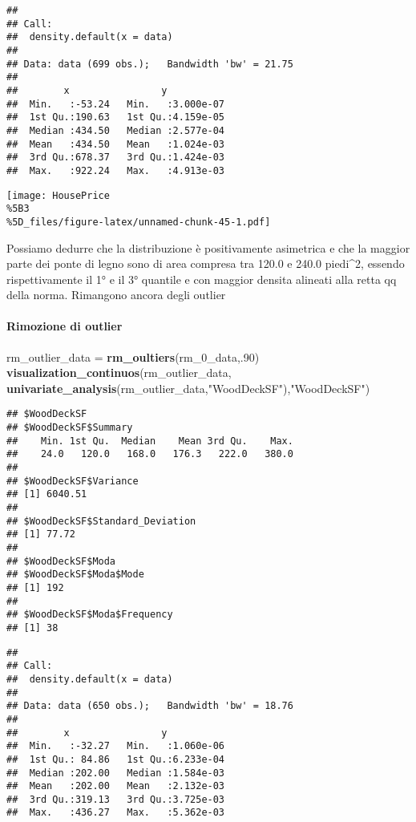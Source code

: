 \documentclass[
]{article}
\newenvironment{Shaded}{\begin{snugshade}}{\end{snugshade}}
\newcommand{\DecValTok}[1]{\textcolor[rgb]{0.00,0.00,0.81}{#1}}
\newcommand{\FunctionTok}[1]{\textcolor[rgb]{0.13,0.29,0.53}{\textbf{#1}}}
\newcommand{\NormalTok}[1]{#1}
\newcommand{\OtherTok}[1]{\textcolor[rgb]{0.56,0.35,0.01}{#1}}
\newcommand{\StringTok}[1]{\textcolor[rgb]{0.31,0.60,0.02}{#1}}
\begin{document}
\begin{verbatim}
## 
## Call:
##  density.default(x = data)
## 
## Data: data (699 obs.);   Bandwidth 'bw' = 21.75
## 
##        x                y            
##  Min.   :-53.24   Min.   :3.000e-07  
##  1st Qu.:190.63   1st Qu.:4.159e-05  
##  Median :434.50   Median :2.577e-04  
##  Mean   :434.50   Mean   :1.024e-03  
##  3rd Qu.:678.37   3rd Qu.:1.424e-03  
##  Max.   :922.24   Max.   :4.913e-03
\end{verbatim}

\texttt{[image: HousePrice\\\%5B3\\\%5D\_files/figure-latex/unnamed-chunk-45-1.pdf]}

Possiamo dedurre che la distribuzione è positivamente asimetrica e che
la maggior parte dei ponte di legno sono di area compresa tra 120.0 e
240.0 piedi\^{}2, essendo rispettivamente il 1° e il 3° quantile e con
maggior densita alineati alla retta qq della norma. Rimangono ancora
degli outlier

\paragraph{Rimozione di outlier}\label{rimozione-di-outlier-10}

\begin{Shaded}
\begin{Highlighting}[]
\NormalTok{rm\_outlier\_data }\OtherTok{=} \FunctionTok{rm\_oultiers}\NormalTok{(rm\_0\_data,.}\DecValTok{90}\NormalTok{)}
\FunctionTok{visualization\_continuos}\NormalTok{(rm\_outlier\_data, }\FunctionTok{univariate\_analysis}\NormalTok{(rm\_outlier\_data,}\StringTok{"WoodDeckSF"}\NormalTok{),}\StringTok{"WoodDeckSF"}\NormalTok{)}
\end{Highlighting}
\end{Shaded}

\begin{verbatim}
## $WoodDeckSF
## $WoodDeckSF$Summary
##    Min. 1st Qu.  Median    Mean 3rd Qu.    Max. 
##    24.0   120.0   168.0   176.3   222.0   380.0 
## 
## $WoodDeckSF$Variance
## [1] 6040.51
## 
## $WoodDeckSF$Standard_Deviation
## [1] 77.72
## 
## $WoodDeckSF$Moda
## $WoodDeckSF$Moda$Mode
## [1] 192
## 
## $WoodDeckSF$Moda$Frequency
## [1] 38
\end{verbatim}

\begin{verbatim}
## 
## Call:
##  density.default(x = data)
## 
## Data: data (650 obs.);   Bandwidth 'bw' = 18.76
## 
##        x                y            
##  Min.   :-32.27   Min.   :1.060e-06  
##  1st Qu.: 84.86   1st Qu.:6.233e-04  
##  Median :202.00   Median :1.584e-03  
##  Mean   :202.00   Mean   :2.132e-03  
##  3rd Qu.:319.13   3rd Qu.:3.725e-03  
##  Max.   :436.27   Max.   :5.362e-03
\end{verbatim}
\end{document}
